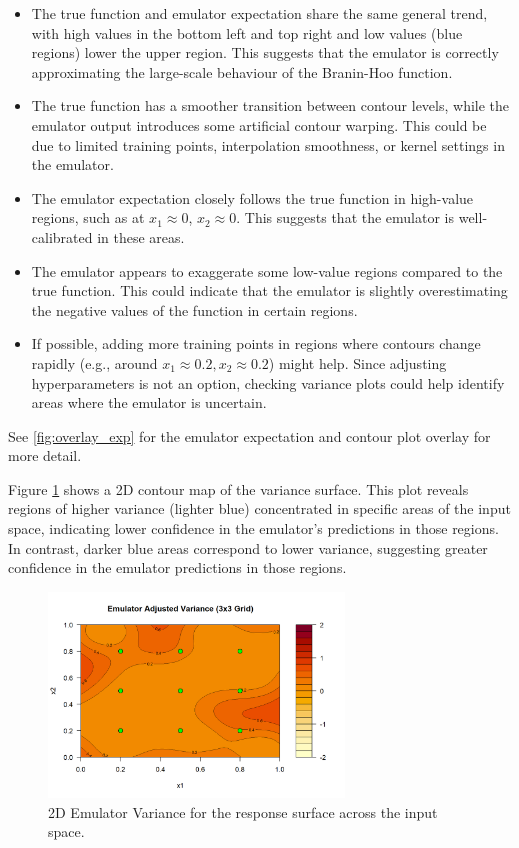 \begin{itemize}
    \item The true function and emulator expectation share the same general trend, with high values in the bottom left and top right and low values (blue regions) lower the upper region. 
    This suggests that the emulator is correctly approximating the large-scale behaviour of the Branin-Hoo function.

    \item The true function has a smoother transition between contour levels, while the emulator output introduces some artificial contour warping. 
    This could be due to limited training points, interpolation smoothness, or kernel settings in the emulator.

    \item The emulator expectation closely follows the true function in high-value regions, such as at \(x_1 \approx 0\), \(x_2 \approx 0\). 
    This suggests that the emulator is well-calibrated in these areas.

    \item The emulator appears to exaggerate some low-value regions compared to the true function. 
    This could indicate that the emulator is slightly overestimating the negative values of the function in certain regions.

    \item If possible, adding more training points in regions where contours change rapidly (e.g., around \(x_1 \approx 0.2, x_2 \approx 0.2\)) might help. 
    Since adjusting hyperparameters is not an option, checking variance plots could help identify areas where the emulator is uncertain.
\end{itemize}

\noindent See \ref{fig:overlay_exp} for the emulator expectation and contour plot overlay for more detail.

Figure \ref{fig:Var} shows a 2D contour map of the variance surface. This plot reveals regions of higher variance (lighter blue) concentrated in specific areas of the input space, indicating lower confidence in the emulator's predictions in those regions. In contrast, darker blue areas correspond to lower variance, suggesting greater confidence in the emulator predictions in those regions.

\begin{figure}[H]
    \centering
    \includegraphics[width=0.7\textwidth]{2D Emulator Variance.png}
    \caption{2D Emulator Variance for the response surface across the input space.}
    \label{fig:Var}
\end{figure}

